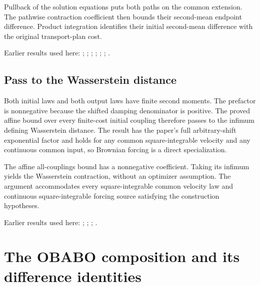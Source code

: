 \documentclass[11pt,a4paper]{report}
\begin{document}
Pullback of the solution equations puts both paths on the common extension. The pathwise contraction coefficient then bounds their second-mean endpoint difference. Product integration identifies their initial second-mean difference with the original transport-plan cost.



Earlier results used here: \cite[Section~3.13.2]{LangevinLean2026ULASC}; \cite[Section~3.17.1]{LangevinLean2026ULASC}; \cite[Section~3.17.13]{LangevinLean2026ULASC}; \cite[Section~3.17.2]{LangevinLean2026ULASC}; \cite[Section~3.17.4]{LangevinLean2026ULASC}; \cite[Section~3.22.15]{LangevinLean2026ULASC}; \cite[Section~3.22.2]{LangevinLean2026ULASC}.
\subsection{\texorpdfstring{Pass to the Wasserstein distance}{Pass to the Wasserstein distance}}
\label{report-step-KineticLangevin-ProductContinuousFlow-lean-4}


Both initial laws and both output laws have finite second moments. The prefactor is nonnegative because the shifted damping denominator is positive. The proved affine bound over every finite-cost initial coupling therefore passes to the infimum defining Wasserstein distance. The result has the paper’s full arbitrary-shift exponential factor and holds for any common square-integrable velocity and any continuous common input, so Brownian forcing is a direct specialization.



The affine all-couplings bound has a nonnegative coefficient. Taking its infimum yields the Wasserstein contraction, without an optimizer assumption. The argument accommodates every square-integrable common velocity law and continuous square-integrable forcing source satisfying the construction hypotheses.



Earlier results used here: \cite[Section~3.17.3]{LangevinLean2026ULASC}; \cite[Section~3.17.4]{LangevinLean2026ULASC}; \cite[Section~3.18.4]{LangevinLean2026ULASC}; \cite[Section~3.21.2]{LangevinLean2026ULASC}.
\section{\texorpdfstring{The OBABO composition and its difference identities}{The OBABO composition and its difference identities}}
\label{proof-module-KineticLangevin-OBABO-lean}
\end{document}
